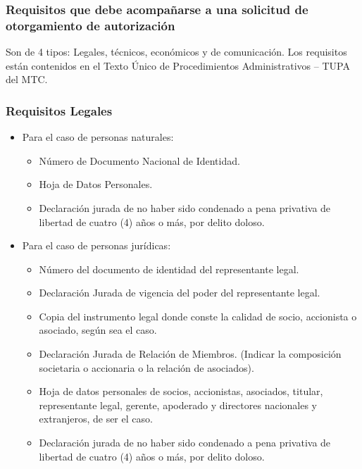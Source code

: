\documentclass[a4paper]{IEEEtran} %
\begin{document}
\subsubsection{Requisitos que debe acompañarse a una solicitud de otorgamiento de autorización}

Son de 4 tipos: Legales, técnicos, económicos y de comunicación. Los requisitos están 
contenidos  en  el  Texto  Único  de  Procedimientos 
Administrativos – TUPA del MTC. 

\subsubsection{Requisitos Legales}

\begin{itemize}
	\item Para el caso de personas naturales:
	\begin{itemize}
		\item Número de Documento Nacional de Identidad. 
		\item Hoja de Datos Personales. 
		\item Declaración jurada de no haber sido 
		condenado a pena privativa de libertad de cuatro 
		(4) años o más, por delito doloso. 
	\end{itemize}
	\item Para el caso de personas jurídicas: 
	\begin{itemize}
		\item Número del documento de identidad del 
		representante legal. 
		\item Declaración  Jurada  de  vigencia  del  poder  del 
		representante legal. 
		\item Copia  del  instrumento  legal  donde  conste  la 
		calidad  de  socio,  accionista  o  asociado,  según 
		sea el caso. 
		\item Declaración  Jurada  de  Relación  de  Miembros. 
		(Indicar  la  composición  societaria  o  accionaria  o 
		la relación de asociados).
		\item Hoja de datos personales de socios, accionistas, 
		asociados,  titular,  representante  legal,  gerente, 
		apoderado  y  directores  nacionales  y  extranjeros, 
		de ser el caso. 
		\item Declaración jurada de no haber sido 
		condenado a pena privativa de libertad de cuatro 
		(4) años o más, por delito doloso.
	\end{itemize}
\end{itemize}
\end{document}
